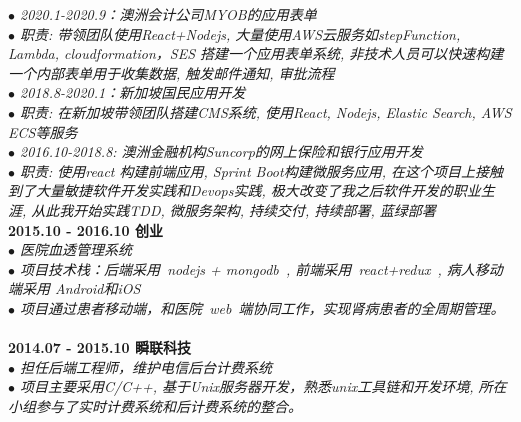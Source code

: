 \documentclass[a3paper,12pt,final]{memoir}
\newcommand{\myThemeColor}{RoyalBlue}
\newcommand{\CVItem}[1]
	{\textbf{\color{\myThemeColor} #1}}
\begin{document}
\begin{CJK*}{UTF8}{gbsn}
\textit{$\bullet$ 2020.1-2020.9：澳洲会计公司MYOB的应用表单} \\
\textit{$\bullet$ 职责: 带领团队使用React+Nodejs, 大量使用AWS云服务如stepFunction, Lambda, cloudformation，SES 搭建一个应用表单系统, 非技术人员可以快速构建一个内部表单用于收集数据, 触发邮件通知, 审批流程} \\

\textit{$\bullet$ 2018.8-2020.1：新加坡国民应用开发} \\
\textit{$\bullet$ 职责: 在新加坡带领团队搭建CMS系统, 使用React, Nodejs, Elastic Search, AWS ECS等服务 } \\

\textit{$\bullet$ 2016.10-2018.8: 澳洲金融机构Suncorp的网上保险和银行应用开发} \\
\textit{$\bullet$ 职责: 使用react 构建前端应用, Sprint Boot构建微服务应用, 在这个项目上接触到了大量敏捷软件开发实践和Devops实践, 极大改变了我之后软件开发的职业生涯, 从此我开始实践TDD, 微服务架构, 持续交付, 持续部署, 蓝绿部署} \\

\CVItem{2015.10 - 2016.10 \hfill 创业}\\
\textit{$\bullet$ 医院血透管理系统} \\
\textit{$\bullet$ 项目技术栈：后端采用~nodejs + mongodb~, 前端采用~react+redux~, 病人移动端采用 Android和iOS} \\
\textit{$\bullet$ 项目通过患者移动端，和医院~web~端协同工作，实现肾病患者的全周期管理。}\\
\\
\CVItem{2014.07 - 2015.10 \hfill 瞬联科技}\\
\textit{$\bullet$ 担任后端工程师，维护电信后台计费系统} \\
\textit{$\bullet$ 项目主要采用C/C++, 基于Unix服务器开发，熟悉unix工具链和开发环境, 所在小组参与了实时计费系统和后计费系统的整合。} \\

\end{CJK*}
\end{document}
